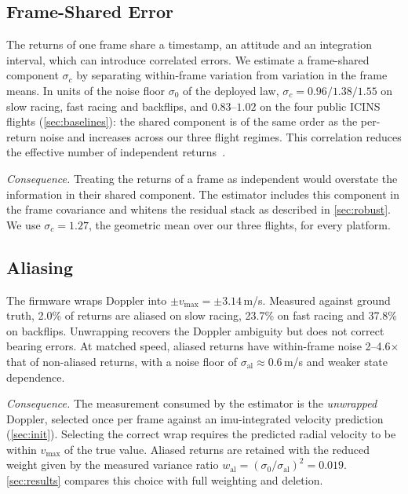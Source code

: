 \subsection{Frame-Shared Error}
\label{sec:char_corr}
The returns of one frame share a timestamp, an attitude and an
integration interval, which can introduce correlated errors.
We estimate a frame-shared component $\sigma_c$ by separating
within-frame variation from variation in the frame means.
In units of the noise floor $\sigma_0$ of the deployed law,
$\sigma_c = 0.96/1.38/1.55$ on slow racing, fast racing
and backflips, and $0.83$--$1.02$ on the four public ICINS flights
(\autoref{sec:baselines}): the shared component is of the same order
as the per-return noise and increases across our three flight regimes.
This correlation reduces the effective number of independent
returns~\cite{kish1965survey}.

\emph{Consequence.}  Treating the returns of a frame as independent
would overstate the information in their shared component.
The estimator includes this component in the frame covariance and
whitens the residual stack as described in \autoref{sec:robust}.
We use $\sigma_c = 1.27$, the geometric mean over our three flights,
for every platform.

\subsection{Aliasing}
\label{sec:char_alias}
The firmware wraps Doppler into $\pm v_{\max} = \pm3.14$\,m/s.  Measured
against ground truth, 2.0\% of returns are aliased on slow racing,
23.7\% on fast racing and 37.8\% on backflips.
Unwrapping recovers the Doppler ambiguity but does not correct bearing
errors.  At matched speed, aliased returns have within-frame noise
2--4.6$\times$ that of non-aliased returns, with a noise floor of
$\sigma_{\mathrm{al}} \approx 0.6$\,m/s and weaker state dependence.

\emph{Consequence.}  The measurement consumed by the estimator is the
\emph{unwrapped} Doppler, selected once per frame against an
\ac{imu}-integrated velocity prediction (\autoref{sec:init}).  Selecting
the correct wrap requires the predicted radial velocity to be within
$v_{\max}$ of the true value.  Aliased returns are retained with the
reduced weight given by the measured
variance ratio $w_{\mathrm{al}} = (\sigma_0/\sigma_{\mathrm{al}})^2 = 0.019$.
\autoref{sec:results} compares this choice with full weighting and deletion.

